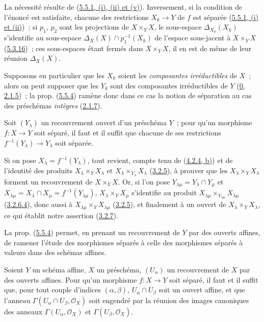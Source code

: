 La nécessité résulte de
(\hyperref[I.5.5.1-fr]{5.5.1, (i), (ii) et (v)}). Inversement, si la condition
de l'énoncé est satisfaite, chacune des restrictions $X_k\to Y$ de $f$ est
séparée (\hyperref[I.5.5.1-fr]{5.5.1, (i) et (ii)})~; si $p_1$, $p_2$ sont les
projections de $X\times_Y X$, le sous-espace $\Delta_{X_k}(X_k)$ s'identifie
au sous-espace $\Delta_X(X)\cap p_1^{-1}(X_k)$ de l'espace sous-jacent à
$X\times_Y X$ (\hyperref[I.5.3.16-fr]{5.3.16})~; ces sous-espaces étant
fermés dans $X\times_Y X$, il en est de même de leur réunion $\Delta_X(X)$.

Supposons en particulier que les $X_k$ soient les
\emph{composantes irréductibles} de $X$~; alors on peut supposer que les $Y_k$
sont des composantes irréductibles de $Y$
(\hyperref[0.2.1.5-fr]{0, 2.1.5})~; la prop.
(\hyperref[I.5.5.4-fr]{5.5.4}) ramène donc dans ce cas la notion de séparation
au cas des préschémas \emph{intègres} (\hyperref[I.2.1.7-fr]{2.1.7}).


\begin{proposition}[5.5.5]
\label{I.5.5.5-fr}
Soit $(Y_\lambda)$ un recouvrement ouvert d'un préschéma $Y$~; pour qu'un
morphisme $f:X\to Y$ soit séparé, il faut et il suffit que chacune de ses
restrictions $f^{-1}(Y_\lambda)\to Y_\lambda$ soit séparée.
\end{proposition}

Si on pose $X_\lambda=f^{-1}(Y_\lambda)$, tout revient, compte tenu de
(\hyperref[I.4.2.4-fr]{4.2.4, b)}) et de l'identité des produits
$X_\lambda\times_Y X_\lambda$ et
$X_\lambda\times_{Y_\lambda}X_\lambda$
(\hyperref[I.3.2.5-fr]{3.2.5}), à prouver que les
$X_\lambda\times_Y X_\lambda$ forment un recouvrement de $X\times_Y X$. Or,
si l'on pose $Y_{\lambda\mu}=Y_\lambda\cap Y_\mu$ et
$X_{\lambda\mu}=X_\lambda\cap X_\mu=f^{-1}(Y_{\lambda\mu})$,
$X_\lambda\times_Y X_\mu$ s'identifie au produit
$X_{\lambda\mu}\times_{Y_{\lambda\mu}}X_{\lambda\mu}$
(\hyperref[I.3.2.6.4-fr]{3.2.6.4}), donc aussi à
$X_{\lambda\mu}\times_Y X_{\lambda\mu}$
(\hyperref[I.3.2.5-fr]{3.2.5}), et finalement à un ouvert de
$X_\lambda\times_Y X_\lambda$, ce qui établit notre assertion
(\hyperref[I.3.2.7-fr]{3.2.7}).

La prop. (\hyperref[I.5.5.4-fr]{5.5.4}) permet, en prenant un recouvrement de
$Y$ par des ouverts affines, de ramener l'étude des morphismes séparés à celle
des morphismes séparés à valeurs dans des schémas affines.

\begin{proposition}[5.5.6]
\label{I.5.5.6-fr}
Soient $Y$ un schéma affine, $X$ un préschéma, $(U_\alpha)$ un recouvrement de
$X$ par des ouverts affines. Pour qu'un morphisme $f:X\to Y$ soit séparé, il
faut et il suffit que, pour tout couple d'indices $(\alpha,\beta)$,
$U_\alpha\cap U_\beta$ soit un ouvert affine, et que l'anneau
$\Gamma(U_\alpha\cap U_\beta,\mathscr{O}_X)$ soit engendré par la réunion des
images canoniques des anneaux $\Gamma(U_\alpha,\mathscr{O}_X)$ et
$\Gamma(U_\beta,\mathscr{O}_X)$.
\end{proposition}


